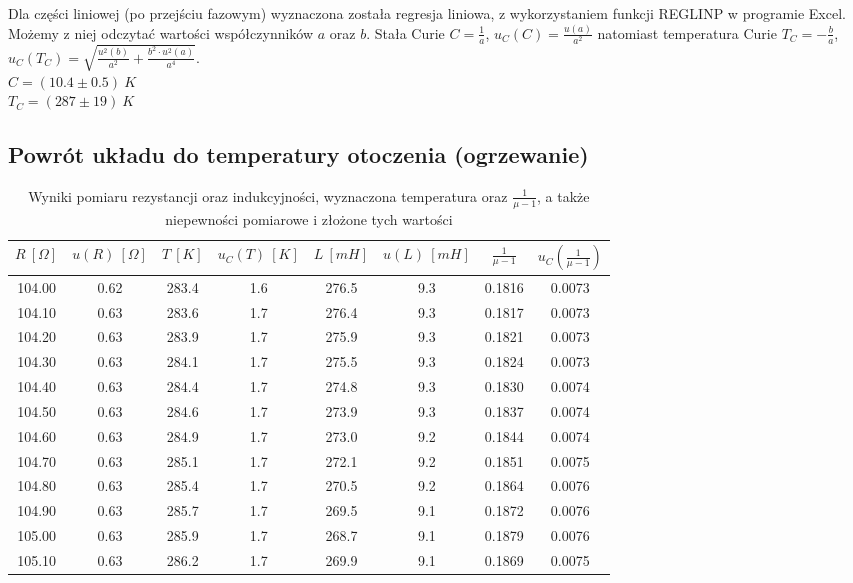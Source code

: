 \documentclass[12pt, a4paper, oneside]{article}
\begin{document}
\indent	Dla części liniowej (po przejściu fazowym) wyznaczona została regresja liniowa, z wykorzystaniem funkcji REGLINP w programie Excel. Możemy z niej odczytać wartości współczynników $a$ oraz $b$. Stała Curie $C=\frac{1}{a}$, $u_C(C)=\frac{u(a)}{a^2}$ natomiast temperatura Curie $T_C=-\frac{b}{a}$, $u_C(T_C)=\sqrt{\frac{u^2(b)}{a^2}+\frac{b^2\cdot u^2(a)}{a^4}}$.\\

\noindent$C=(10.4 \pm 0.5)~K$\\
$T_C=(287\pm19)~K$
\clearpage
\subsection{Powrót układu do temperatury otoczenia (ogrzewanie)}
\begin{longtable}[h]{|c|c|c|c|c|c|c|c|}
\caption{Wyniki pomiaru rezystancji oraz indukcyjności, wyznaczona temperatura oraz $\frac{1}{\mu-1}$, a także niepewności pomiarowe i złożone tych wartości}
\label{variability_impl_mech}
\endfirsthead
\endhead
\hline
    $R~[\Omega]$ & $u(R)~[\Omega]$ & $T~[K]$ & $u_C(T)~[K]$ & $L~[mH]$ & 
    $u(L)~[mH]$ & $\frac{1}{\mu-1}$ & $u_C(\frac{1}{\mu-1})$ \\\hline
    104.00 & 0.62 & 283.4 & 1.6 & 276.5 & 9.3 & 0.1816 & 0.0073 \\\hline
    104.10 & 0.63 & 283.6 & 1.7 & 276.4 & 9.3 & 0.1817 & 0.0073 \\\hline
    104.20 & 0.63 & 283.9 & 1.7 & 275.9 & 9.3 & 0.1821 & 0.0073 \\\hline
    104.30 & 0.63 & 284.1 & 1.7 & 275.5 & 9.3 & 0.1824 & 0.0073 \\\hline
    104.40 & 0.63 & 284.4 & 1.7 & 274.8 & 9.3 & 0.1830 & 0.0074 \\\hline
    104.50 & 0.63 & 284.6 & 1.7 & 273.9 & 9.3 & 0.1837 & 0.0074 \\\hline
    104.60 & 0.63 & 284.9 & 1.7 & 273.0 & 9.2 & 0.1844 & 0.0074 \\\hline
    104.70 & 0.63 & 285.1 & 1.7 & 272.1 & 9.2 & 0.1851 & 0.0075 \\\hline
    104.80 & 0.63 & 285.4 & 1.7 & 270.5 & 9.2 & 0.1864 & 0.0076 \\\hline
    104.90 & 0.63 & 285.7 & 1.7 & 269.5 & 9.1 & 0.1872 & 0.0076 \\\hline
    105.00 & 0.63 & 285.9 & 1.7 & 268.7 & 9.1 & 0.1879 & 0.0076 \\\hline
    105.10 & 0.63 & 286.2 & 1.7 & 269.9 & 9.1 & 0.1869 & 0.0075 \\\hline

\end{longtable}
\end{document}

